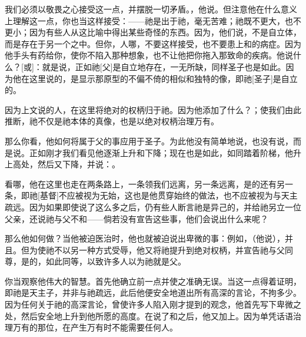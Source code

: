 我们必须以敬畏之心接受这一点，并摆脱一切矛盾。，他说。但注意他在什么意义上理解这一点，你也当这样接受：——祂是出于祂，毫无苦难；祂既不更大，也不更小；因为有些人从这比喻中得出某些奇怪的东西。因为，他们说，不是自立体，而是存在于另一个之中。但你，人哪，不要这样接受，也不要患上和的病症。因为他手头有药给你，使你不陷入那种想象，也不让他把你拖入那致命的疾病。他说什么？[或]：就是说，正如祂[父]是自立地存在，一无所缺，同样圣子也是如此。因为他在这里说的，是显示那原型的不偏不倚的相似和独特的像，即祂[圣子]是自立的。\par

因为上文说的人，在这里将绝对的权柄归于祂。因为他添加了什么？；使我们由此推断，祂不仅是祂本体的真像，也是以绝对权柄治理万有。\par

那么你看，他如何将属于父的事应用于圣子。为此他没有简单地说，也没有说，而是说。正如刚才我们看见他逐渐上升和下降；现在也是如此，如同踏着阶梯，他升上高处，然后又下降，并说：。\par

看哪，他在这里也走在两条路上，一条领我们远离，另一条远离，是的还有另一条，即祂[基督]不应被视为无始，这也是他贯穿始终的做法，也不应被视为与天主疏远。因为如果即使说了这么多之后，仍有些人断言祂是异己的，并给祂另立一位父亲，还说祂与父不和——倘若没有宣告这些事，他们会说出什么来呢？\par

那么他如何做？当他被迫医治时，他也就被迫说出卑微的事：例如，（他说），并且。但为使祂不以另一种方式受辱，他又将祂提升到绝对权柄，并宣告祂与父同尊，是的，如此同等，以致许多人以为祂就是父。\par

你当观察他伟大的智慧。首先他确立前一点并使之准确无误。当这一点得着证明，即祂是天主子，并非与祂疏远，此后他便安全地道出所有高深的言论，不拘多少。因为任何关于祂的高深言论，曾使许多人陷入刚才提到的观念，他首先写下卑微之处，然后安全地上升到他所愿的高度。在说了和之后，他又加上。因为单凭话语治理万有的那位，在产生万有时不能需要任何人。\par

